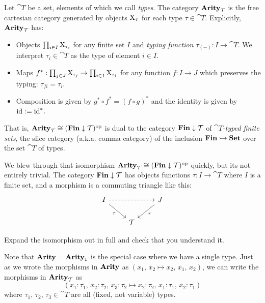 \documentclass[DynamicalBook]{subfiles}
\begin{document}
\begin{definition}
  Let $\cat{T}$ be a set, elements of which we call \emph{types}. The category $\textbf{Arity}_{\mathcal{T}}$ is the
  free cartesian category generated by objects $\mathrm{X}_{\tau}$ for each type $\tau
  \in \cat{T}$. Explicitly, $\textbf{Arity}_{\mathcal{T}}$ has:
  \begin{itemize}
    \item Objects $\prod_{i \in I} \mathrm{X}_{\tau_i}$ for any finite set $I$ and
      \emph{typing function}
      $\tau_{(-)} : I \to \cat{T}$. We interpret $\tau_i \in \cat{T}$ as the
      type of element $i \in I$.
    \item Maps $f^{\ast} : \prod_{j \in J} \mathrm{X}_{\tau_j} \to
      \prod_{i \in I} \mathrm{X}_{\tau_i}$ for any function $f : I \to J$ which
      preserves the typing: $\tau_{fi} = \tau_i$.
    \item Composition is given by $g^{\ast} \circ f^{\ast} = (f \circ g)^{\ast}$
      and the identity is given by $\mathrm{id} := \mathrm{id}^{\ast}$. 
  \end{itemize}
  That is, $\textbf{Arity}_{\mathcal{T}} \cong (\textbf{Fin} \downarrow \mathcal{T})^{\textnormal{op}}$ is dual to
  the category
  $\textbf{Fin} \downarrow \mathcal{T}$ of \emph{$\cat{T}$-typed finite sets}, the slice category (a.k.a. comma category)
  of the inclusion $\textbf{Fin} \hookrightarrow \textbf{Set}$ over the set $\cat{T}$
  of types. 
\end{definition}

\begin{exercise}
  We blew through that isomorphism $\textbf{Arity}_{\mathcal{T}} \cong (\textbf{Fin} \downarrow
  \mathcal{T})^{\textnormal{op}}$ quickly, but its not entirely trivial. The category $\textbf{Fin} \downarrow
  \mathcal{T}$ has objects functions $\tau : I \to \cat{T}$ where $I$ is a finite
  set, and a morphism is a commuting triangle like this:
  \[
    \begin{tikzcd}
      I \ar[rr, dashed] \ar[dr, "\tau"'] & & J \ar[dl, "\tau"] \\
      & \cat{T} &
    \end{tikzcd}
  \]


  Expand the isomorphism out in full and check
  that you understand it.
\end{exercise}

Note that $\textbf{Arity} = \textbf{Arity}_{\mathsf{1}}$ is the special case where we have a single
type. Just as we wrote the morphisms in $\textbf{Arity}$ as $(x_1,\, x_2 \mapsto x_2,\,
x_1,\, x_2)$, we can write the morphisms in $\textbf{Arity}_{\mathcal{T}}$ as
$$(x_1 : \tau_1,\, x_2 : \tau_2,\, x_3 : \tau_2 \mapsto x_2 : \tau_2,\, x_1 :
\tau_1,\, x_2 : \tau_1)$$
where $\tau_1,\, \tau_2,\, \tau_3 \in \cat{T}$ are all (fixed, not variable) types.
\end{document}
